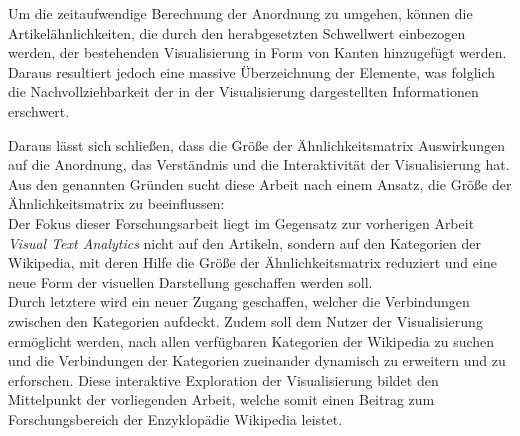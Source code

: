 Um die zeitaufwendige Berechnung der Anordnung zu umgehen, können die Artikelähnlichkeiten, die durch den herabgesetzten Schwellwert einbezogen  werden, der bestehenden Visualisierung in Form von Kanten hinzugefügt werden. 
Daraus resultiert jedoch eine massive Überzeichnung der Elemente, was folglich die Nachvollziehbarkeit der in der Visualisierung dargestellten Informationen erschwert.

Daraus lässt sich schließen, dass die Größe der Ähnlichkeitsmatrix Auswirkungen auf die Anordnung, das Verständnis und die Interaktivität der Visualisierung hat.
Aus den genannten Gründen sucht diese Arbeit nach einem Ansatz, die Größe der Ähnlichkeitsmatrix zu beeinflussen:\\
Der Fokus dieser Forschungsarbeit liegt im Gegensatz zur vorherigen Arbeit \emph{Visual Text Analytics} nicht auf den Artikeln, sondern auf den Kategorien der Wikipedia, mit deren Hilfe die Größe der Ähnlichkeitsmatrix reduziert und eine neue Form der visuellen Darstellung geschaffen werden soll.\\
Durch letztere wird ein neuer Zugang geschaffen, welcher die Verbindungen zwischen den Kategorien aufdeckt.
Zudem soll dem Nutzer der Visualisierung ermöglicht werden, nach allen verfügbaren Kategorien der Wikipedia zu suchen und die Verbindungen der Kategorien zueinander dynamisch zu erweitern und zu erforschen.
Diese interaktive Exploration der Visualisierung bildet den Mittelpunkt der vorliegenden Arbeit, welche somit einen Beitrag zum Forschungsbereich der Enzyklopädie Wikipedia leistet.




